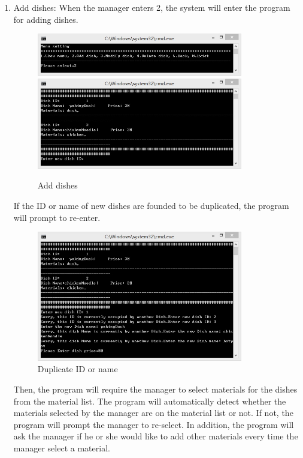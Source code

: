 \documentclass{article}
\begin{document}
\begin{enumerate}
    \item Add dishes:\newline 
    When the manager enters 2, the system will enter the program for adding dishes.
        \begin{figure}[H]
        \centering
        \includegraphics[width=0.85\textwidth]{D/D2a.jpg}
        \includegraphics[width=0.85\textwidth]{D/D2b.jpg}
        \caption{Add dishes}
        \end{figure}
    \noindent
    If the ID or name of new dishes are founded to be duplicated, the program will prompt to re-enter.
        \begin{figure}[H]
        \centering
        \includegraphics[width=0.85\textwidth]{D/D2c.jpg}
        \caption{Duplicate ID or name}
        \end{figure}
    \noindent
    Then, the program will require the manager to select materials for the dishes from the material list. The program will automatically detect whether the materials selected by the manager are on the material list or not. If not, the program will prompt the manager to re-select. In addition, the program will ask the manager if he or she would like to add other materials every time the manager select a material.

\end{enumerate}
\end{document}
